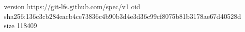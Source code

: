 version https://git-lfs.github.com/spec/v1
oid sha256:136c3cb284eacb4ce73836c4b90b3d4e3d36c99cf8075b81b3178ae67d40528d
size 118409
